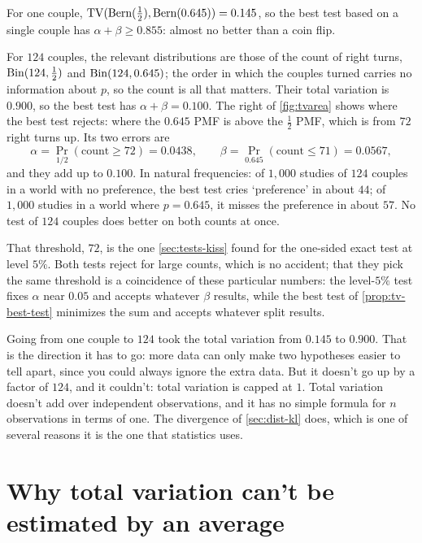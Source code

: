 \begin{worked}
For one couple, $\mathrm{TV}(\text{Bern}(\frac12), \text{Bern}(0.645)) = 0.145$, so the best test based on a single couple has $\alpha + \beta \geq 0.855$: almost no better than a coin flip.

For $124$ couples, the relevant distributions are those of the count of right turns, $\mathrm{Bin}(124, \frac12)$ and $\mathrm{Bin}(124, 0.645)$; the order in which the couples turned carries no information about $p$, so the count is all that matters.
Their total variation is $0.900$, so the best test has $\alpha + \beta = 0.100$.
The right of \cref{fig:tvarea} shows where the best test rejects: where the $0.645$ PMF is above the $\frac12$ PMF, which is from $72$ right turns up.
Its two errors are
\[
\alpha = \Pr_{1/2}(\text{count} \geq 72) = 0.0438, \qquad \beta = \Pr_{0.645}(\text{count} \leq 71) = 0.0567,
\]
and they add up to $0.100$.
In natural frequencies: of $1{,}000$ studies of $124$ couples in a world with no preference, the best test cries `preference' in about $44$; of $1{,}000$ studies in a world where $p = 0.645$, it misses the preference in about $57$.
No test of $124$ couples does better on both counts at once.

That threshold, $72$, is the one \cref{sec:tests-kiss} found for the one-sided exact test at level $5\%$.
Both tests reject for large counts, which is no accident; that they pick the same threshold is a coincidence of these particular numbers: the level-$5\%$ test fixes $\alpha$ near $0.05$ and accepts whatever $\beta$ results, while the best test of \cref{prop:tv-best-test} minimizes the sum and accepts whatever split results.
\end{worked}

\begin{sanitycheck}
Going from one couple to $124$ took the total variation from $0.145$ to $0.900$.
That is the direction it has to go: more data can only make two hypotheses easier to tell apart, since you could always ignore the extra data.
But it doesn't go up by a factor of $124$, and it couldn't: total variation is capped at $1$.
Total variation doesn't add over independent observations, and it has no simple formula for $n$ observations in terms of one.
The divergence of \cref{sec:dist-kl} does, which is one of several reasons it is the one that statistics uses.
\end{sanitycheck}

\section{Why total variation can't be estimated by an average}
\label{sec:dist-tv-estimate}

